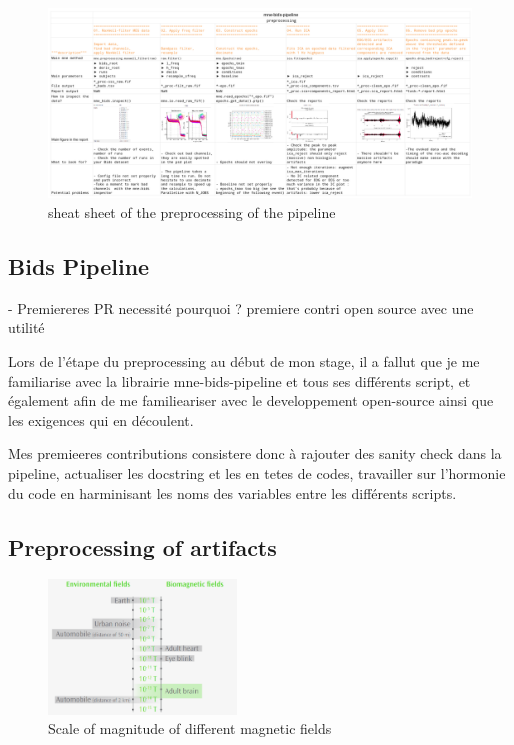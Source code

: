\begin{figure}[ht]
    \centering
    \includegraphics[width=15cm]{images_report/preprocessing/cheatsheet preprocessing.png}
    \caption[sheat sheet of the preprocessing of the pipeline]%
    {sheat sheet of the preprocessing of the pipeline}

    \label{cheat_sheet}
\end{figure}


\subsection{Bids Pipeline}
- Premiereres PR necessité pourquoi ?
premiere contri open source
avec une utilité

Lors de l'étape du preprocessing au début de mon stage, il a fallut que je me familiarise avec la librairie mne-bids-pipeline et tous ses différents script, et également afin de me familieariser avec le developpement open-source ainsi que les exigences qui en découlent.

Mes premieeres contributions consistere donc à rajouter des sanity check dans la pipeline, actualiser les docstring et les en tetes de codes, travailler sur l'hormonie du code en harminisant les noms des variables entre les différents scripts.

\subsection{Preprocessing of artifacts}


\begin{figure}[ht]
    \centering
    \includegraphics[width=5cm]{images_report/sensor/noise_order_of_magnitude.png}
    \caption[Scale of magnitude of different magnetic fields]%
    {Scale of magnitude of different magnetic fields}

    \label{noise_order_of_magnitude}
\end{figure}


